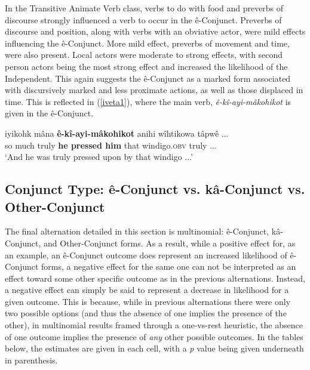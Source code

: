             In the Transitive Animate Verb class, verbs to do with food and preverbs of discourse strongly influenced a verb to occur in the ê-Conjunct. Preverbs of discourse and position, along with verbs with an obviative actor, were mild effects influencing the ê-Conjunct. More mild effect, preverbs of movement and time, were also present. Local actors were moderate to strong effects, with second person actors being the most strong effect and increased the likelihood of the Independent. This again suggests the ê-Conjunct as a marked form associated with discursively marked and less proximate actions, as well as those displaced in time. This is reflected in (\ref{iveta1}), where the main verb, \textit{ê-kî-ayi-mâkohikot} is given in the ê-Conjunct.


        \begin{exe}
        \ex
        \gll iyikohk mâna \textbf{ê-kî-ayi-mâkohikot} anihi wîhtikowa tâpwê ... \\
             {so much} {truly} {\textbf{he pressed him}} {that} {windigo.\textsc{obv}} truly ...        \\
        \trans `And he was truly pressed upon by that windigo ...' \citep[34]{AhenakewAlice2000}
        \label{iveta1}
        \end{exe}




\FloatBarrier

\subsection{Conjunct Type: ê-Conjunct vs. kâ-Conjunct vs. Other-Conjunct}

The final alternation detailed in this section is multinomial: ê-Conjunct, kâ-Conjunct, and Other-Conjunct forms. As a result, while a positive effect for, as an example, an ê-Conjunct outcome does represent an increased likelihood of ê-Conjunct forms, a negative effect for the same one can not be interpreted as an effect toward some other specific outcome as in the previous alternations. Instead, a negative effect can simply be said to represent a decrease in likelihood for a given outcome. This is because, while in previous alternations there were only two possible options (and thus the absence of one implies the presence of the other), in multinomial results framed through a one-vs-rest heuristic, the absence of one outcome implies the presence of \textit{any} other possible outcomes. In the tables below, the estimates are given in each cell, with a \textit{p} value being given underneath in parenthesis.


